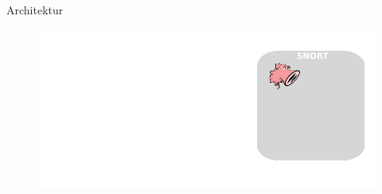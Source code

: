 \begin{frame}{Architektur}
    \begin{figure}
    	\centering
    	\includegraphics[width=\textwidth]{./images/arch/1.pdf}
    \end{figure}
\end{frame}
